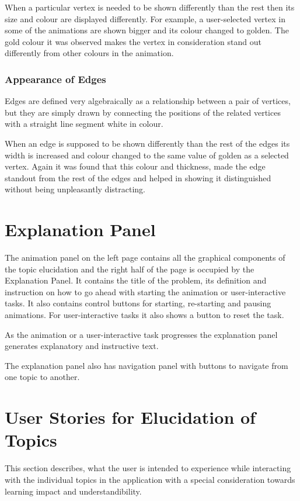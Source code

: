 When a particular vertex is needed to be shown differently than the rest then
its size and colour are displayed differently. For example, a user-selected
vertex in some of the animations are shown bigger and its colour changed to
golden. The gold colour it was observed makes the vertex in consideration
stand out differently from other colours in the animation.

\subsubsection{Appearance of Edges}
Edges are defined very algebraically as a relationship between a pair
of vertices, but they are simply drawn by connecting the positions of the related vertices with a straight line segment white in colour.

When an edge is supposed to be shown differently than the rest of the edges its
width is increased and colour changed to the same value of golden as a selected vertex.
Again it was found that this colour and thickness, made the edge standout from the
rest of the edges and helped in showing it distinguished without being unpleasantly
distracting.

\section{Explanation Panel}
The animation panel on the left page contains all the graphical
components of the topic elucidation and the right half of the page is occupied by
the Explanation Panel. It contains the title of the problem,
its definition and instruction on how to go ahead with starting the animation
or user-interactive tasks.  It also contains control buttons for starting,
re-starting and pausing animations.  For user-interactive tasks it also shows a button to reset the task.

As the animation or a user-interactive task progresses the explanation panel
generates explanatory and instructive text.

The explanation panel also has navigation panel with buttons to navigate from
one topic to another.

\section{User Stories for Elucidation of Topics}

This section describes, what the user is intended to experience while
interacting with the individual topics in the application with a special
consideration towards learning impact and understandibility.

